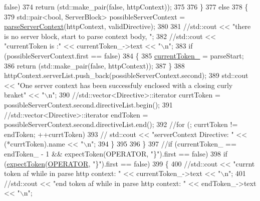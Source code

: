 \begin{DoxyCode}
{      false})
374                     \textcolor{keywordflow}{return} (std::make\_pair(\textcolor{keyword}{false}, httpContext));
375                 
376             \}
377             \textcolor{keywordflow}{else}
378             \{
379                 std::pair<bool, ServerBlock>    possibleServerContext = 
      \hyperlink{classft_1_1_parser_ae53bb700e0344f7af2519a5af3ae4230}{parseServerContext}(httpContext, validDirective);
380 
381                 \textcolor{comment}{//std::cout << "there is no server block, start to parse context body, ";}
382                 \textcolor{comment}{//std::cout << "currentToken is :" << currentToken\_->text << "\(\backslash\)n";}
383                 \textcolor{keywordflow}{if} (possibleServerContext.first == \textcolor{keyword}{false})
384                 \{
385                     \hyperlink{classft_1_1_parser_a942c5b794d108f144c5b5028aaa34cb6}{currentToken\_} = parseStart;
386                     \textcolor{keywordflow}{return} (std::make\_pair(\textcolor{keyword}{false}, httpContext));
387                 \}
388                 httpContext.serverList.push\_back(possibleServerContext.second);
389                 std::cout << \textcolor{stringliteral}{"One server context has been successfuly enclosed with a closing curly braket"}
       << \textcolor{stringliteral}{"\(\backslash\)n"};
390                 \textcolor{comment}{//std::vector<Directive>::iterator  currtToken =
       possibleServerContext.second.directiveList.begin();}
391                 \textcolor{comment}{//std::vector<Directive>::iterator  endToken =
       possibleServerContext.second.directiveList.end();}
392                 \textcolor{comment}{//for (; currtToken != endToken; ++currtToken)}
393                 \textcolor{comment}{//  std::cout << "serverContext Directive: " << (*currtToken).name << "\(\backslash\)n";}
394             \}
395 
396         \}
397         \textcolor{comment}{//if (currentToken\_ == endToken\_ - 1 && expectToken(OPERATOR, "\}").first == false)}
398         \textcolor{keywordflow}{if} (\hyperlink{classft_1_1_parser_a1615a752d3642bb53598e2c8db810db0}{expectToken}(\hyperlink{namespaceft_aa520fbf142ba1e7e659590c07da31921a6411d9d6073252e4d316493506bbb979}{OPERATOR}, \textcolor{stringliteral}{"\}"}).first == \textcolor{keyword}{false})
399         \{
400             \textcolor{comment}{//std::cout << "currnt token af while in parse http context: " << currentToken\_->text << "\(\backslash\)n";}
401             \textcolor{comment}{//std::cout << "end token af while in parse http context: " << endToken\_->text << "\(\backslash\)n";}

\end{DoxyCode}
